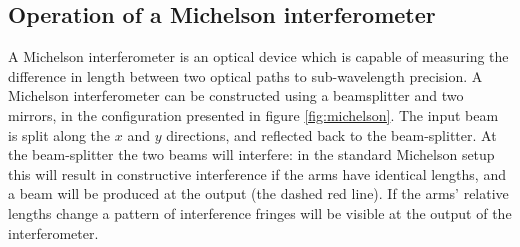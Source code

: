 \subsection{Operation of a Michelson interferometer}
\label{sec:Michelson}
%
%
A Michelson interferometer is an optical device which is capable of
measuring the difference in length between two optical paths to
sub-wavelength precision. A Michelson interferometer can be
constructed using a beamsplitter and two mirrors, in the configuration
presented in figure \ref{fig:michelson}. The input beam is split along
the $x$ and $y$ directions, and reflected back to the
beam-splitter. At the beam-splitter the two beams will interfere: in
the standard Michelson setup this will result in constructive
interference if the arms have identical lengths, and a beam will be
produced at the output (the dashed red line). If the arms' relative
lengths change a pattern of interference fringes will be visible at
the output of the interferometer.

